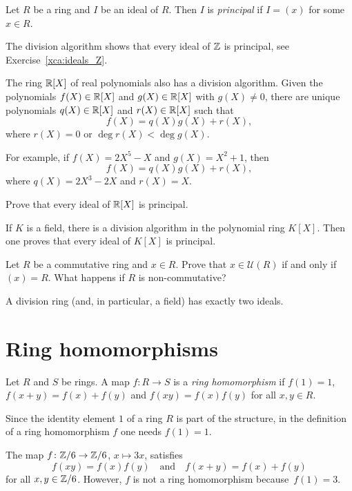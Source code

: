 \begin{definition}
Let $R$ be a ring and $I$ be an ideal of $R$. Then $I$ is \emph{principal}
if $I=(x)$ for some $x\in R$. 	
\end{definition}

The division algorithm shows that every ideal of $\mathbb{Z}$ is principal, 
see Exercise~\ref{xca:ideals_Z}.  

The ring $\mathbb{R}[X]$ of real polynomials also has a division algorithm. Given the
polynomials $f(X)\in\mathbb{R}[X]$ and $g(X)\in\mathbb{R}[X]$ with $g(X)\ne 0$, there are unique 
polynomials $q(X)\in\mathbb{R}[X]$ and $r(X)\in\mathbb{R}[X]$ such that 
\[
f(X)=q(X)g(X)+r(X),
\]
where $r(X)=0$ or $\deg r(X)<\deg g(X)$. 

For example, 
if $f(X)=2X^5-X$ and $g(X)=X^2+1$, then 
\[
f(X)=q(X)g(X)+r(X),
\]
where $q(X)=2X^3-2X$ and $r(X)=X$. 

\begin{exercise}
\label{xca:R[X]_principal}
	Prove that every ideal of $\mathbb{R}[X]$ is principal. 
\end{exercise}

If $K$ is a field, there is a division algorithm in the 
polynomial ring $K[X]$. Then one proves 
that every ideal of $K[X]$ is principal.  

\begin{exercise}
\label{xca:x_unit}
	Let $R$ be a commutative ring and $x\in R$. Prove that $x\in\mathcal{U}(R)$ if and only if
	$(x)=R$. What happens if $R$ is non-commutative?
\end{exercise}

A division ring (and, in particular, a field) has exactly two ideals. 

\section{Ring homomorphisms}

\begin{definition}
Let $R$ and $S$ be rings. A map $f\colon R\to S$ is a \emph{ring homomorphism}  
if $f(1)=1$, $f(x+y)=f(x)+f(y)$ and $f(xy)=f(x)f(y)$ for all $x,y\in R$. 	
\end{definition}

Since the identity element $1$ of a ring $R$ 
is part of the structure, in 
the definition
of a ring homomorphism $f$ one needs $f(1)=1$.  

\begin{example}
The map $f\colon\mathbb{Z}/6\to\mathbb{Z}/6$, $x\mapsto 3x$, satisfies 
\[
f(xy)=f(x)f(y)\quad\text{and}\quad f(x+y)=f(x)+f(y)
\]
for all $x,y\in\mathbb{Z}/6$. However, $f$ is not a ring homomorphism because~$f(1)=3$. 	
\end{example}
 
